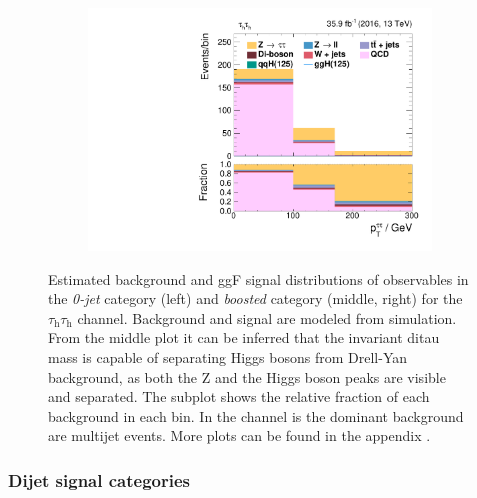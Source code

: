 \begin{figure}[h!]
\begin{subfigure}{.32\textwidth}
        \includegraphics[width=\textwidth]{Figures/eventselection/tt/BoostedCP/H_pt.pdf}
    \end{subfigure} %
    \caption[Background modeling in the \textit{0-jet} and \textit{boosted} categories.]{ Estimated background and ggF signal distributions of observables in the \textit{0-jet} category (left) and \textit{boosted} category (middle, right) for the $\tau_\text{h}\tau_\text{h}$ channel. 
    Background and signal are modeled from simulation. From the middle plot it can be inferred that the invariant ditau mass is capable of separating Higgs bosons from Drell-Yan background, as both the Z and the Higgs boson peaks are visible and separated. The subplot shows the relative fraction of each background in each bin. In the \tautau{} channel is the dominant background are multijet events. More plots can be found in the appendix .}\label{ES:controlplots:0jet_boosted}  
\end{figure}%

\subsubsection{Dijet signal categories}

